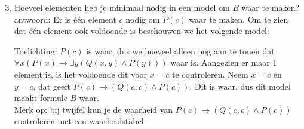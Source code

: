 \begin{answer}
\begin{enumerate}[label=\textit{\alph*.}]
\setcounter{enumi}{2}
\item Hoeveel elementen heb je minimaal nodig in een model om $B$ waar te maken?\\
antwoord: Er is \'e\'en element $c$ nodig om $P(c)$ waar te maken.  Om te zien dat \'e\'en element ook voldoende is beschouwen we het volgende model:
\begin{center}
\end{center}
Toelichting: $P(c)$ is waar,  dus we hoeveel alleen nog aan te tonen dat $\forall x(P(x)\rightarrow\exists y(Q(x,y)\wedge P(y)))$ waar is.  Aangezien er maar 1 element is,  is het voldoende dit voor $x = c$ te controleren. 
Neem $x = c$ en $y = c$,  dat geeft $P(c) \rightarrow (Q(c,c) \land P(c))$.  Dit is waar,  dus dit model maakt formule $B$ waar.\\
Merk op: bij twijfel kun je de waarheid van $P(c) \rightarrow (Q(c,c) \land P(c))$ controleren met een waarheidstabel.

\end{enumerate}\mbox{}\\[2.5pt]
\end{answer}
